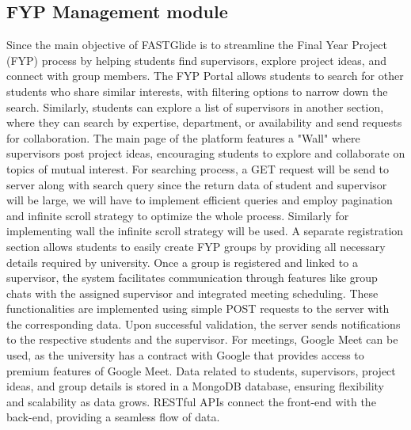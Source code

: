 \documentclass{FastFyp}
\begin{document}
\subsection{FYP Management module}
Since the main objective of FASTGlide is to streamline the Final Year Project (FYP) process by helping students find supervisors, explore project ideas, and connect with group members. The FYP Portal allows students to search for other students who share similar interests, with filtering options to narrow down the search. Similarly, students can explore a list of supervisors in another section, where they can search by expertise, department, or availability and send requests for collaboration. The main page of the platform features a "Wall" where supervisors post project ideas, encouraging students to explore and collaborate on topics of mutual interest. For searching process, a GET request will be send to server along with search query since the return data of student and supervisor will be large, we will have to implement efficient queries and employ pagination and infinite scroll strategy to optimize the whole process. Similarly for implementing wall the infinite scroll strategy will be used.
A separate registration section allows students to easily create FYP groups by providing all necessary details required by university. Once a group is registered and linked to a supervisor, the system facilitates communication through features like group chats with the assigned supervisor and integrated meeting scheduling. These functionalities are implemented using simple POST requests to the server with the corresponding data. Upon successful validation, the server sends notifications to the respective students and the supervisor. For meetings, Google Meet can be used, as the university has a contract with Google that provides access to premium features of Google Meet.
Data related to students, supervisors, project ideas, and group details is stored in a MongoDB database, ensuring flexibility and scalability as data grows. RESTful APIs connect the front-end with the back-end, providing a seamless flow of data.
\end{document}
